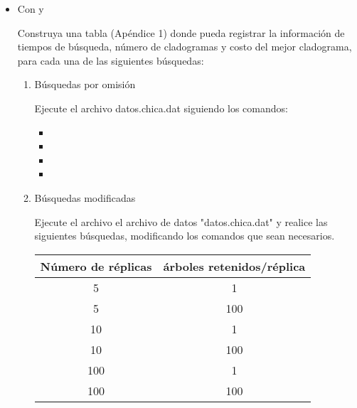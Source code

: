 \begin{itemize}
  \item Con  y 

	Construya una tabla (Ap\'endice 1) donde pueda registrar la informaci\'on de tiempos de b\'usqueda,   n\'umero de cladogramas y costo del mejor cladograma,  para cada una de las siguientes b\'usquedas:
 

	\begin{enumerate}
	  \item  {B\'usquedas por omisi\'on}

  		Ejecute el archivo datos.chica.dat siguiendo los comandos:

  		\begin{itemize}
  			\item  {}

  			

  			\item  {}

  			\item  {}


  			\item  {}

  		\end{itemize}



	  \item{B\'usquedas modificadas}

		Ejecute el archivo el archivo de datos "datos.chica.dat" y realice las siguientes b\'usquedas,  modificando los comandos que sean necesarios.
 

 \begin{table}[H]
 \centering
 \begin{tabular}{|c|c|}
 \hline
  N\'umero de r\'eplicas & \'arboles retenidos/r\'eplica\\
 \hline
  5 & 1\\ 
   \hline
  5 & 100\\
   \hline 
  10& 1\\ 
   \hline
   10& 100\\
    \hline 
  100 & 1 \\
   \hline
   100 & 100 \\
  \hline
  

\end{tabular}
\end{table}
\end{enumerate}
\end{itemize}
